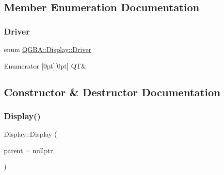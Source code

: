 \subsection{Member Enumeration Documentation}
\mbox{\label{class_q_g_b_a_1_1_display_a43f4be6bd7830df1380fcc10165488d0}} 
\subsubsection{\texorpdfstring{Driver}{Driver}}
{\footnotesize\ttfamily enum \mbox{\hyperlink{class_q_g_b_a_1_1_display_a43f4be6bd7830df1380fcc10165488d0}{Q\+G\+B\+A\+::\+Display\+::\+Driver}}\hspace{0.3cm}{\ttfamily [strong]}}

\begin{DoxyEnumFields}{Enumerator}
[0pt][0pt]{}\mbox{\label{class_q_g_b_a_1_1_display_a43f4be6bd7830df1380fcc10165488d0a33b8d767c1f7c7984d900797e2bb7727}} 
QT&\\
\hline

\end{DoxyEnumFields}


\subsection{Constructor \& Destructor Documentation}
\mbox{\label{class_q_g_b_a_1_1_display_a751b596b9c83d0f05c41e7bdb85d92e6}} 
\subsubsection{\texorpdfstring{Display()}{Display()}}
{\footnotesize\ttfamily Display\+::\+Display (\begin{DoxyParamCaption}\item[{Q\+Widget $\ast$}]{parent = {\ttfamily nullptr} }\end{DoxyParamCaption})}



